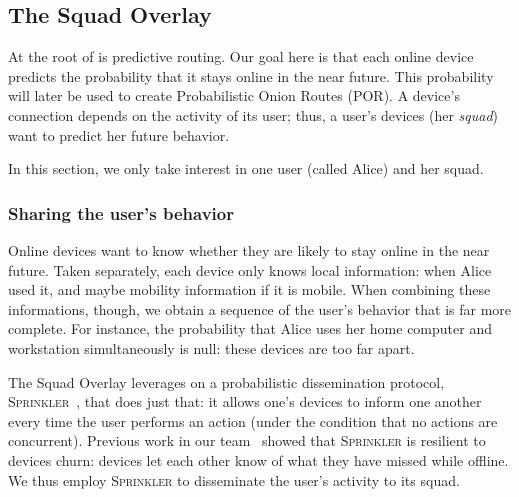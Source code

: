\subsection{The Squad Overlay} 
\label{sec:squad_overlay}

At the root of \name is predictive routing.
Our goal here is that each online device predicts the probability that it stays online in the near future.
This probability will later be used to create Probabilistic Onion Routes (POR).
A device's connection depends on the activity of its user; thus, a user's devices (her \emph{squad}) want to predict her future behavior.

In this section, we only take interest in one user (called Alice) and her squad.



\subsubsection{Sharing the user's behavior} %
\label{sub:sharing_knowledge}

Online devices want to know whether they are likely to stay online in the near future.
Taken separately, each device only knows local information: when Alice used it, and maybe mobility information if it is mobile.
When combining these informations, though, we obtain a sequence of the user's behavior that is far more complete.
For instance, the probability that Alice uses her home computer and workstation simultaneously is null: these devices are too far apart.

The Squad Overlay leverages on a probabilistic dissemination protocol, \textsc{Sprinkler}~\cite{luxey:hal-01704172}, that does just that: 
it allows one's devices to inform one another every time the user performs an action (under the condition that no actions are concurrent).
Previous work in our team~\cite{luxey:cascade} showed that \textsc{Sprinkler} is resilient to devices churn: 
devices let each other know of what they have missed while offline.
We thus employ \textsc{Sprinkler} to disseminate the user's activity to its squad.

